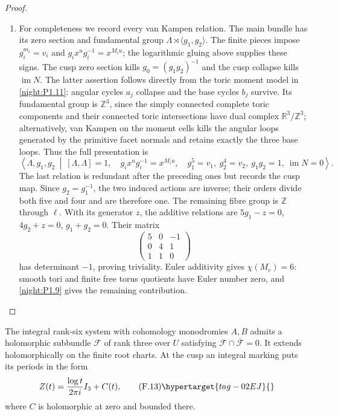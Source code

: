 \begin{proof}
\begin{enumerate}[label={$\langle1\rangle$\arabic*.}]
\item For completeness we record every van Kampen relation.  The main
bundle has its zero section and fundamental group
$\Lambda\rtimes\langle g_1,g_2\rangle$.
The finite pieces impose
$g_i^{m_i}=v_i$ and $g_ix^ug_i^{-1}=x^{M_iu}$; the logarithmic gluing
above supplies these signs.  The cusp zero section kills
$g_0=(g_1g_2)^{-1}$ and the cusp collapse kills $\operatorname{im}N$.
The latter assertion follows directly from the toric moment model in
\cref{night:P1.11}: angular cycles $a_j$ collapse and the base cycles $b_j$ survive.
Its fundamental group is $\mathbb Z^3$, since the simply connected
complete toric components and their connected toric intersections have
dual complex $\mathbb R^3/\mathbb Z^3$; alternatively, van Kampen on
the moment cells kills the angular loops generated by the primitive
facet normals and retains exactly the three base loops.
Thus the full presentation is
\[
\left\langle \Lambda,g_1,g_2\ \middle|\
 [\Lambda,\Lambda]=1,\quad
 g_ix^ug_i^{-1}=x^{M_iu},\quad
 g_1^5=v_1,\ g_2^4=v_2,\ g_1g_2=1,\ \operatorname{im}N=0
\right\rangle.
\]
The last relation is redundant after the preceding ones but records
the cusp map.  Since $g_2=g_1^{-1}$, the two induced actions are
inverse; their orders divide both five and four and are therefore one.
The remaining fibre group is $\mathbb Z$ through $\ell$.  With its
generator $z$, the additive relations are
$5g_1-z=0$, $4g_2+z=0$, $g_1+g_2=0$.
Their matrix
\[
\begin{pmatrix}5&0&-1\\0&4&1\\1&1&0\end{pmatrix}
\]
has determinant $-1$, proving triviality.
Euler additivity gives $\chi(M_c)=6$: smooth tori and finite free
torus quotients have Euler number zero, and \cref{night:P1.9} gives the remaining
contribution.

\end{enumerate}
\end{proof}

\begin{theorem}\hypertarget{tag-02O8}{}\label{maps:src:F.3.6}


The integral rank-six system with cohomology monodromies $A,B$
admits a holomorphic subbundle $\mathcal F$ of rank three over
$U$ satisfying $\mathcal F\cap\overline{\mathcal F}=0$.
It extends holomorphically on the finite root charts.  At the
cusp an integral marking puts its periods in the form
\[
 Z(t)=\frac{\log t}{2\pi i}I_3+C(t),
 \tag{F.13}\hypertarget{tag-02EJ}{}\label{maps:eq:F.13}
\]
where $C$ is holomorphic at zero and bounded there.

\end{theorem}


